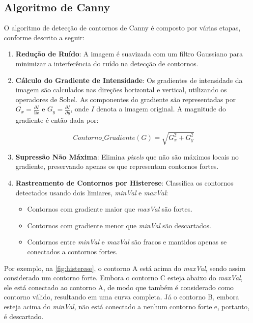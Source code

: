 \subsection{Algoritmo de Canny}

O algoritmo de detecção de contornos de Canny é composto por várias etapas, conforme descrito a seguir:

\begin{enumerate}
    \item \textbf{Redução de Ruído}: A imagem é suavizada com um filtro Gaussiano para minimizar a interferência do ruído na detecção de contornos.

    \item \textbf{Cálculo do Gradiente de Intensidade}: Os gradientes de intensidade da imagem são calculados nas direções horizontal e vertical, utilizando os operadores de Sobel. As componentes do gradiente são representadas por \( G_x = \frac{\partial I}{\partial x} \) e \( G_y = \frac{\partial I}{\partial y} \), onde \( I \) denota a imagem original. A magnitude do gradiente é então dada por:

    
    \[Contorno\_Gradiente(G) = \sqrt{G_{x}^{2} + G_{y}^{2}}\]

    \item \textbf{Supressão Não Máxima}: Elimina \textit{pixels} que não são máximos locais no gradiente, preservando apenas os que representam contornos fortes.

    \item \textbf{Rastreamento de Contornos por Histerese}: Classifica os contornos detectados usando dois limiares, \textit{minVal} e \textit{maxVal}:
    \begin{itemize}
        \item Contornos com gradiente maior que \textit{maxVal} são fortes.
        \item Contornos com gradiente menor que \textit{minVal} são descartados.
        \item Contornos entre \textit{minVal} e \textit{maxVal} são fracos e mantidos apenas se conectados a contornos fortes.
    \end{itemize}
\end{enumerate}

Por exemplo, na \autoref{fig:histerese}, o contorno A está acima do \textit{maxVal}, sendo assim considerado um contorno forte. Embora o contorno C esteja abaixo do \textit{maxVal}, ele está conectado ao contorno A, de modo que também é considerado como contorno válido, resultando em uma curva completa. Já o contorno B, embora esteja acima do \textit{minVal}, não está conectado a nenhum contorno forte e, portanto, é descartado.

